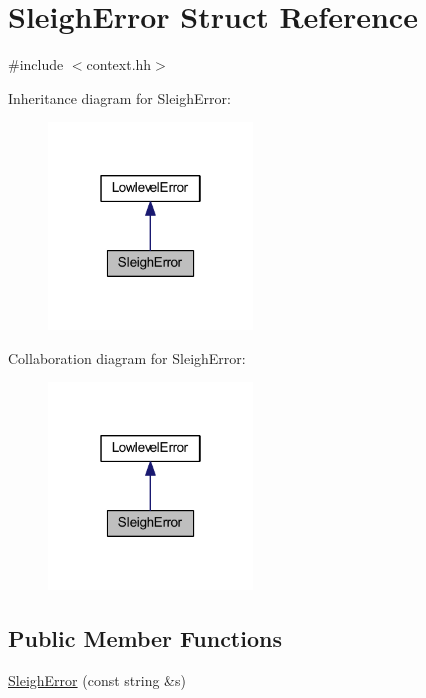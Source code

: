 \hypertarget{struct_sleigh_error}{}\section{Sleigh\+Error Struct Reference}
\label{struct_sleigh_error}


{\ttfamily \#include $<$context.\+hh$>$}



Inheritance diagram for Sleigh\+Error\+:
\nopagebreak
\begin{figure}[H]
\begin{center}
\leavevmode
\includegraphics[width=154pt]{struct_sleigh_error__inherit__graph}
\end{center}
\end{figure}


Collaboration diagram for Sleigh\+Error\+:
\nopagebreak
\begin{figure}[H]
\begin{center}
\leavevmode
\includegraphics[width=154pt]{struct_sleigh_error__coll__graph}
\end{center}
\end{figure}
\subsection*{Public Member Functions}
\begin{DoxyCompactItemize}
\item 
\mbox{\hyperlink{struct_sleigh_error_aca6dd3498456e656aedc7a513b464121}{Sleigh\+Error}} (const string \&s)
\end{DoxyCompactItemize}
